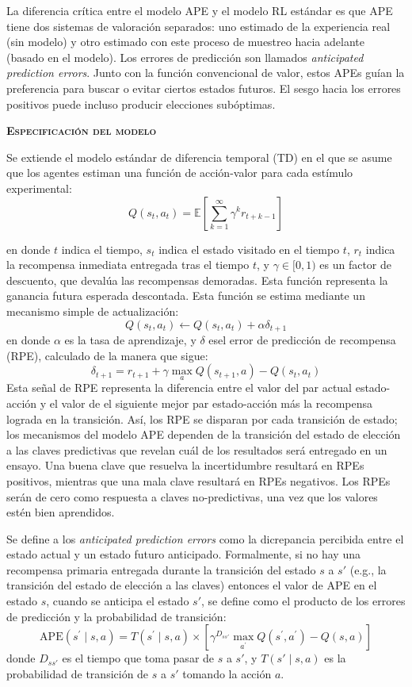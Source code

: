 \documentclass[a4paper,12pt]{article}
\begin{document}
La diferencia crítica entre el modelo APE y el modelo RL estándar es que APE tiene dos sistemas de valoración separados: uno estimado de la experiencia real (sin modelo) y otro estimado con este proceso de muestreo hacia adelante (basado en el modelo). Los errores de predicción son llamados {\slshape anticipated prediction errors}. Junto con la función convencional de valor, estos APEs guían la preferencia para buscar o evitar ciertos estados futuros. El sesgo hacia los errores positivos puede incluso producir elecciones subóptimas.

{\scshape\bfseries Especificación del modelo}

Se extiende el modelo estándar de diferencia temporal (TD) en el que se asume que los agentes estiman una función de acción-valor para cada estímulo experimental:
$$Q(s_t,a_t)= \mathbb{E}[\sum_{k=1}^{\infty} \gamma^k r_{t+k-1}]$$

en donde $t$ indica el tiempo, $s_t$ indica el estado visitado en el tiempo $t$, $r_t$ indica la recompensa inmediata entregada tras el tiempo $t$, y $\gamma\in[0,1)$ es un factor de descuento, que devalúa las recompensas demoradas. Esta función representa la ganancia futura esperada descontada. Esta función se estima mediante un mecanismo simple de actualización:
$$
Q\left(s_{t}, a_{t}\right) \leftarrow Q\left(s_{t}, a_{t}\right)+\alpha \delta_{t+1}
$$
en donde $\alpha$ es la tasa de aprendizaje, y $\delta$ esel error de predicción de recompensa (RPE), calculado de la manera que sigue:
$$
\delta_{t+1}=r_{t+1}+\gamma \max _{a} Q\left(s_{t+1}, a\right)-Q\left(s_{t}, a_{t}\right)
$$
Esta señal de RPE representa la diferencia entre el valor del par actual estado-acción y el valor de el siguiente mejor par estado-acción más la recompensa lograda en la transición. Así, los RPE se disparan por cada transición de estado; los mecanismos del modelo APE dependen de la transición del estado de elección a las claves predictivas que revelan cuál de los resultados será entregado en un ensayo. Una buena clave que resuelva la incertidumbre resultará en RPEs positivos, mientras que una mala clave resultará en RPEs negativos. Los RPEs serán de cero como respuesta a claves no-predictivas, una vez que los valores estén bien aprendidos.

Se define a los {\itshape anticipated prediction errors} como la dicrepancia percibida entre el estado actual y un estado futuro anticipado. Formalmente, si no hay una recompensa primaria entregada durante la transición del estado $s$ a $s'$ (e.g., la transición del estado de elección a las claves) entonces el valor de APE en el estado $s$, cuando se anticipa el estado $s'$, se define como el producto de los errores de predicción y la probabilidad de transición:
$$
\mbox{APE}\left(s^{\prime} \mid s, a\right)=T\left(s^{\prime} \mid s, a\right) \times\left[\gamma^{D_{ss'}} \max _{a^{\prime}} Q\left(s^{\prime}, a^{\prime}\right)-Q(s, a)\right]
$$
donde $D_{ss'}$ es el tiempo que toma pasar de $s$ a $s'$, y $T(s'\mid s,a)$ es la probabilidad de transición de $s$ a $s'$ tomando la acción $a$.
\end{document}
